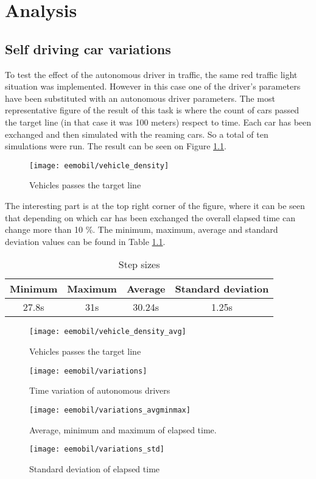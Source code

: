 \chapter{Analysis}
	\section{Self driving car variations}
		To test the effect of the autonomous driver in traffic, the same red traffic light situation was implemented. However in this case one of the driver's parameters have been substituted with an autonomous driver parameters. The most representative figure of the result of this task is where the count of cars passed the target line (in that case it was 100 meters) respect to time. Each car has been exchanged and then simulated with the reaming cars. So a total of ten simulations were run. The result can be seen on Figure \ref{fig:vehicle_density}.
		\begin{figure}[ht]
			\centering
			\texttt{[image: eemobil/vehicle\_density]}
			\caption{Vehicles passes the target line}
			\label{fig:vehicle_density}
		\end{figure}

		The interesting part is at the top right corner of the figure, where it can be seen that depending on which car has been exchanged the overall elapsed time can change more than 10 \%. The minimum, maximum, average and standard deviation values can be found in Table \ref{tab:vehicle_density_minmaxavg}.
		\begin{table}[ht]
			\begin{center}
				\begin{tabular}{ |c|c|c|c|}
					\hline
					Minimum& Maximum & Average& Standard deviation\\
					\hline
					27.8s&31s&30.24s&1.25s\\
					\hline
				\end{tabular}
			\end{center}
			\caption{Step sizes}
			\label{tab:vehicle_density_minmaxavg}
		\end{table}
		\begin{figure}[ht]
			\centering
			\texttt{[image: eemobil/vehicle\_density\_avg]}
			\caption{Vehicles passes the target line}
			\label{fig:vehicle_density_avg}
		\end{figure}
		\begin{figure}
			\centering
			\texttt{[image: eemobil/variations]}
			\caption{Time variation of autonomous drivers}
			\label{fig:self_variations}
		\end{figure}
		\begin{figure}
			\centering
			\texttt{[image: eemobil/variations\_avgminmax]}
			\caption{Average, minimum and maximum of elapsed time.}
			\label{fig:self_variations_avgminmax}
		\end{figure}
		\begin{figure}
			\centering
			\texttt{[image: eemobil/variations\_std]}
			\caption{Standard deviation of elapsed time}
			\label{fig:self_variations_std}
		\end{figure}
